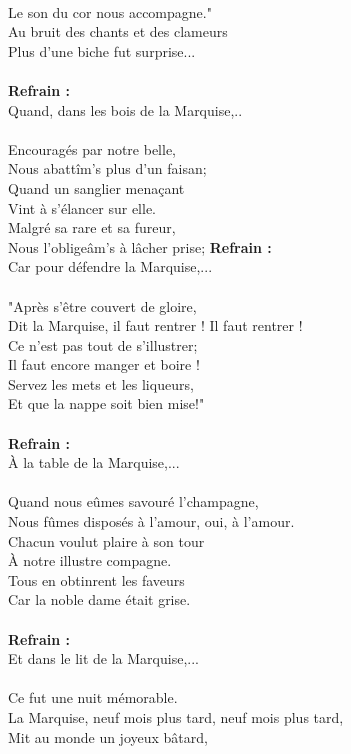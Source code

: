 \\Le son du cor nous accompagne."
\\Au bruit des chants et des clameurs
\\Plus d'une biche fut surprise...
\\\\\textbf{Refrain :}
\\Quand, dans les bois de la Marquise,..
\\\\Encouragés par notre belle,
\\Nous abattîm's plus d'un faisan;
\\Quand un sanglier menaçant
\\Vint à s'élancer sur elle.
\\Malgré sa rare et sa fureur,
\\Nous l'obligeâm's à lâcher prise;
\breakpage
\textbf{Refrain :}
\\Car pour défendre la Marquise,...
\\\\"Après s'être couvert de gloire,
\\Dit la Marquise, il faut rentrer ! Il faut rentrer !
\\Ce n'est pas tout de s'illustrer;
\\Il faut encore manger et boire !
\\Servez les mets et les liqueurs,
\\Et que la nappe soit bien mise!"
\\\\\textbf{Refrain :}
\\À la table de la Marquise,...
\\\\Quand nous eûmes savouré l'champagne,
\\Nous fûmes disposés à l'amour, oui, à l'amour.
\\Chacun voulut plaire à son tour
\\À notre illustre compagne.
\\Tous en obtinrent les faveurs
\\Car la noble dame était grise.
\\\\\textbf{Refrain :}
\\Et dans le lit de la Marquise,...
\\\\Ce fut une nuit mémorable.
\\La Marquise, neuf mois plus tard, neuf mois plus tard,
\\Mit au monde un joyeux bâtard,
